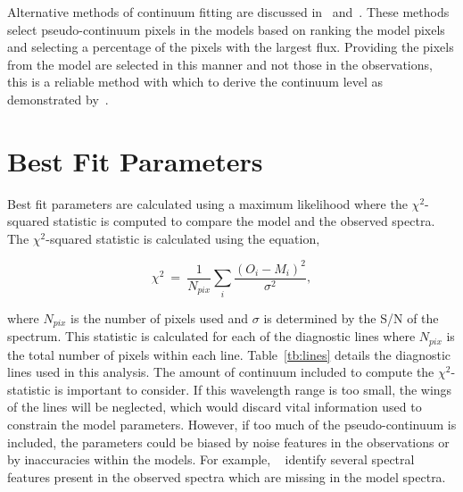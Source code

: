 
Alternative methods of continuum fitting are discussed in~\cite{2010MNRAS.407.1203D} and~\cite{2011A&A...527A..50E}.
These methods select pseudo-continuum pixels in the models based on ranking the model pixels and selecting a percentage of the pixels with the largest flux.
Providing the pixels from the model are selected in this manner and not those in the observations, this is a reliable method with which to derive the continuum level as demonstrated by~\cite{2015ApJ...806...21D}.

\section{Best Fit Parameters} %
\label{sub:best_fit_parameters}

Best fit parameters are calculated using a maximum likelihood where the $\chi^{2}$-squared statistic is computed to compare the model and the observed spectra.
The $\chi^{2}$-squared statistic is calculated using the equation,

\begin{equation}
    \chi^{2}~=~\frac{1}{N_{pix}}\sum\limits_{i}{\frac{(O_{i} - M_{i})^{2}}{\sigma^{2}}},\label{eq:chisq}
\end{equation}

where $N_{pix}$ is the number of pixels used
and $\sigma$ is determined by the S/N of the spectrum.
This statistic is calculated for each of the diagnostic lines where $N_{pix}$ is the total number of pixels within each line.
Table~\ref{tb:lines} details the diagnostic lines used in this analysis.
The amount of continuum included to compute the $\chi^{2}$-statistic is important to consider.
If this wavelength range is too small, the wings of the lines will be neglected,
which would discard vital information used to constrain the model parameters.
However, if too much of the pseudo-continuum is included, the parameters could be biased by noise features in the observations or by inaccuracies within the models.
For example,
~\cite{2014PhDT.........G} identify several spectral features present in the observed spectra which are missing in the model spectra.

